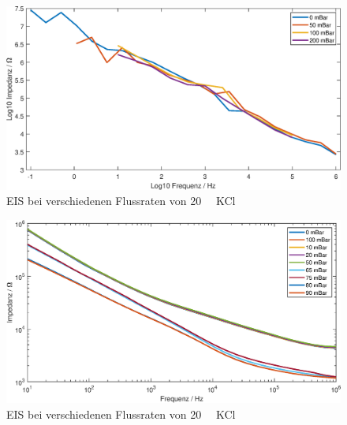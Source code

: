 \begin{figure}[!h]
    \centering
    \includegraphics[width=\linewidth]{plot/FlowRate.eps}
    \caption{EIS bei verschiedenen Flussraten von \SI{20}{\milli\Molar} KCl}
    \label{fig:FlowRate}
\end{figure}
\clearpage

\begin{figure}[!h]
    \centering
    \includegraphics[width=\linewidth]{plot/FlowRate_fine.eps}
    \caption{EIS bei verschiedenen Flussraten von \SI{20}{\milli\Molar} KCl}
    \label{fig:FlowRate_fine}
\end{figure}



